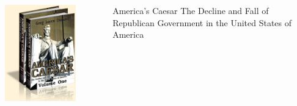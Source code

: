 \begin{frame}
    \begin{columns}[onlytextwidth]
            \centering
            \includegraphics[width=0.75\textwidth]{img/americas-caesar.png} \\

            \begin{block}{America's Caesar}
                The Decline and Fall of Republican Government in the United States of America
            \end{block}
    \end{columns}
\end{frame}

